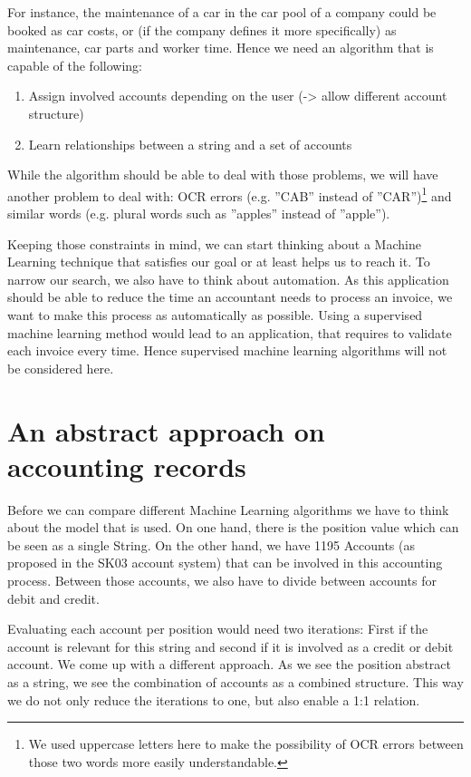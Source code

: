 For instance, the maintenance of a car in the car pool of a company could be booked as car costs, or (if the company defines it more specifically) as maintenance, car parts and worker time.
Hence we need an algorithm that is capable of the following:
\begin{enumerate}
		\item Assign involved accounts depending on the user (-> allow different account structure)
		\item Learn relationships between a string and a set of accounts
\end{enumerate}
While the algorithm should be able to deal with those problems, we will have another problem to deal with: OCR errors (e.g. ''CAB'' instead of ''CAR'')\footnote{We used uppercase letters here to make the possibility of OCR errors between those two words more easily understandable.}  and similar words (e.g. plural words such as ''apples'' instead of ''apple''). 

Keeping those constraints in mind, we can start thinking about a Machine Learning technique that satisfies our goal or at least helps us to reach it.
To narrow our search, we also have to think about automation. As this application should be able to reduce the time an accountant needs to process an invoice, we want to make this process as automatically as possible. Using a supervised machine learning method would lead to an application, that requires to validate each invoice every time. Hence supervised machine learning algorithms will not be considered here.

\section{An abstract approach on accounting records}
\label{sec4.1}

Before we can compare different Machine Learning algorithms we have to think about the model that is used. On one hand, there is the position value which can be seen as a single String. On the other hand, we have 1195 Accounts (as proposed in the SK03 account system) that can be involved in this accounting process. Between those accounts, we also have to divide between accounts for debit and credit.

Evaluating each account per position would need two iterations: First if the account is relevant for this string and second if it is involved as a credit or debit account.
We come up with a different approach. As we see the position abstract as a string, we see the combination of accounts as a combined structure. This way we do not only reduce the iterations to one, but also enable a 1:1 relation.


